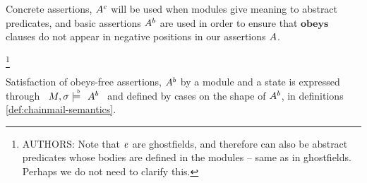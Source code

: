 Concrete assertions, $A^{c}$ will be used when modules give meaning to abstract predicates, and basic assertions $A^{b}$ are used in order to ensure that $\textbf{obeys}$ clauses do not appear in negative positions in our assertions $A$.
 
\footnote{ AUTHORS:  
 Note that $\mathit{e}$ are ghostfields, and therefore can also be abstract predicates whose bodies are defined in the modules -- same as in ghostfields. 
 Perhaps we do not need to clarify this.
 }
 
 Satisfaction  of  obeys-free assertions, $A^{b}$ by a module and a state is expressed  through \ $M , \sigma \models\!\!\!\!^{^b}\ \ {{A^{b}}}$ \  and defined by cases on the shape of $A^{b}$, in definitions \ref{def:chainmail-semantics}.


